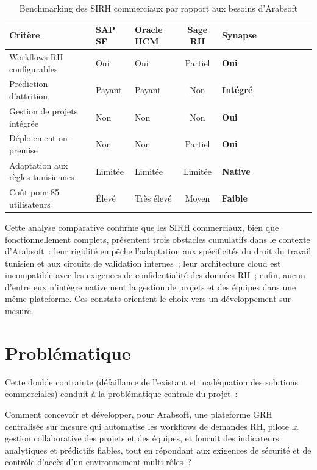\begin{table}[H]
\centering
\caption{Benchmarking des SIRH commerciaux par rapport aux besoins d'Arabsoft}
\label{tab:benchmark_sirh}
\begin{tabularx}{\textwidth}{VLVCVCVCVCV}
\hline
\textbf{Critère} & \textbf{SAP SF} & \textbf{Oracle HCM} & \textbf{Sage RH} & \textbf{Synapse} \\
\hline
Workflows RH configurables & Oui & Oui & Partiel & \textbf{Oui} \\
\hline
Prédiction d'attrition & Payant & Payant & Non & \textbf{Intégré} \\
\hline
Gestion de projets intégrée & Non & Non & Non & \textbf{Oui} \\
\hline
Déploiement on-premise & Non & Non & Partiel & \textbf{Oui} \\
\hline
Adaptation aux règles tunisiennes & Limitée & Limitée & Limitée & \textbf{Native} \\
\hline
Coût pour 85 utilisateurs & Élevé & Très élevé & Moyen & \textbf{Faible} \\
\hline
\end{tabularx}
\end{table}

Cette analyse comparative confirme que les SIRH commerciaux, bien que fonctionnellement
complets, présentent trois obstacles cumulatifs dans le contexte d'Arabsoft~:
leur rigidité empêche l'adaptation aux spécificités du droit du travail tunisien
et aux circuits de validation internes~; leur architecture cloud est incompatible
avec les exigences de confidentialité des données RH~; enfin, aucun d'entre eux
n'intègre nativement la gestion de projets et des équipes dans une même plateforme.
Ces constats orientent le choix vers un développement sur mesure.

\section{Problématique}

Cette double contrainte (défaillance de l'existant et inadéquation des
solutions commerciales) conduit à la problématique centrale du projet~:

\begin{mdframed}[backgroundcolor=blue!5, linecolor=headerblue, linewidth=1.5pt,
                 frametitle={\textbf{Problématique}},
                 frametitlebackgroundcolor=headerblue!80,
                 frametitlefont=\color{white}\bfseries]
Comment concevoir et développer, pour Arabsoft, une plateforme GRH centralisée
sur mesure qui automatise les workflows de demandes RH, pilote la gestion
collaborative des projets et des équipes, et fournit des indicateurs analytiques
et prédictifs fiables, tout en répondant aux exigences de sécurité et de
contrôle d'accès d'un environnement multi-rôles~?
\end{mdframed}

